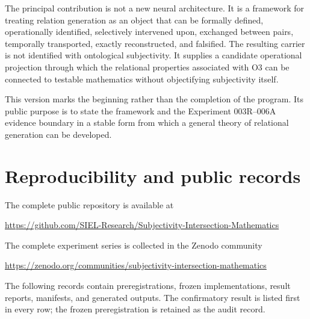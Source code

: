 \documentclass[11pt,a4paper]{article}
\begin{document}
The principal contribution is not a new neural architecture. It is a framework for treating relation generation as an object that can be formally defined, operationally identified, selectively intervened upon, exchanged between pairs, temporally transported, exactly reconstructed, and falsified. The resulting carrier is not identified with ontological subjectivity. It supplies a candidate operational projection through which the relational properties associated with O3 can be connected to testable mathematics without objectifying subjectivity itself.

This version marks the beginning rather than the completion of the program. Its public purpose is to state the framework and the Experiment 003R--006A evidence boundary in a stable form from which a general theory of relational generation can be developed.

\appendix
\section{Reproducibility and public records}

The complete public repository is available at
\begin{center}
{\small\url{https://github.com/SIEL-Research/Subjectivity-Intersection-Mathematics}}
\end{center}

The complete experiment series is collected in the Zenodo community
\begin{center}
{\small\url{https://zenodo.org/communities/subjectivity-intersection-mathematics}}
\end{center}

The following records contain preregistrations, frozen implementations, result reports, manifests, and generated outputs. The confirmatory result is listed first in every row; the frozen preregistration is retained as the audit record.
\end{document}
